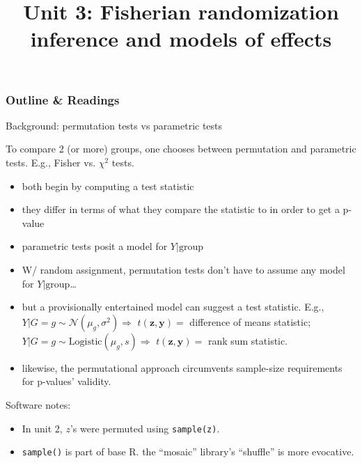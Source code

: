
%

%

%





\title[Fisherian inference]{Unit 3: Fisherian randomization inference and models of effects}




  \begin{frame}
    \frametitle{Outline \& Readings}

\tableofcontents[subsectionstyle=show/hide/hide]



\end{frame}


\begin{frame}[<+->]{Background: permutation tests vs parametric tests}

To compare 2 (or more) groups, one chooses between
permutation and parametric tests. E.g., Fisher vs. $\chi^{2}$ tests.
\begin{itemize}
\item both begin by computing a test statistic
\item they differ in terms of what they compare the statistic to in order to get a p-value
\item parametric tests posit a model for $Y| \mathrm{group}$
\item W/ random assignment, permutation tests don't have to
  assume any model for $Y| \mathrm{group}$\ldots
\item but a provisionally entertained model can suggest a test
  statistic.  E.g., $Y| G=g \sim \mathcal{N}(\mu_{g}, \sigma^{2})
  \Rightarrow $ $t(\mathbf{z}, \mathbf{y}) =$ difference of means statistic; $Y| G=g \sim \mathrm{Logistic}(\mu_{g}, s)
  \Rightarrow $ $t(\mathbf{z}, \mathbf{y}) =$  rank sum statistic.
\item likewise, the permutational approach circumvents sample-size requirements for p-values' validity.
\end{itemize}

Software notes:
\begin{itemize}
\item In unit 2, $z$'s were permuted using \texttt{sample(z)}.
\item \texttt{sample()} is part of base R.  the ``mosaic'' library's
  ``\textrm{shuffle}''  is more evocative.
\end{itemize}

\end{frame}


